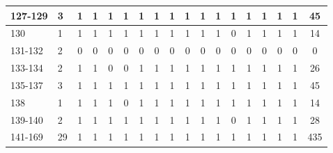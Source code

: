 \begin{table}[htbp]
\begin{center}
{\begin{tabular}{|l|l|c|c|c|c|c|c|c|c|c|c|c|c|c|c|c|c|}
                127-129                                   & 3                                               & 1          & 1          & 1          & 1          & 1          & 1          & 1          & 1          & 1          & 1          & 1          & 1          & 1          & 1          & 1          & 45           \\ \hline
                130                                       & 1                                               & 1          & 1          & 1          & 1          & 1          & 1          & 1          & 1          & 1          & 1          & 0          & 1          & 1          & 1          & 1          & 14           \\ \hline
                131-132                                   & 2                                               & 0          & 0          & 0          & 0          & 0          & 0          & 0          & 0          & 0          & 0          & 0          & 0          & 0          & 0          & 0          & 0            \\ \hline
                133-134                                   & 2                                               & 1          & 1          & 0          & 0          & 1          & 1          & 1          & 1          & 1          & 1          & 1          & 1          & 1          & 1          & 1          & 26           \\ \hline
                135-137                                   & 3                                               & 1          & 1          & 1          & 1          & 1          & 1          & 1          & 1          & 1          & 1          & 1          & 1          & 1          & 1          & 1          & 45           \\ \hline
                138                                       & 1                                               & 1          & 1          & 1          & 0          & 1          & 1          & 1          & 1          & 1          & 1          & 1          & 1          & 1          & 1          & 1          & 14           \\ \hline
                139-140                                   & 2                                               & 1          & 1          & 1          & 1          & 1          & 1          & 1          & 1          & 1          & 1          & 0          & 1          & 1          & 1          & 1          & 28           \\ \hline
                141-169                                   & 29                                              & 1          & 1          & 1          & 1          & 1          & 1          & 1          & 1          & 1          & 1          & 1          & 1          & 1          & 1          & 1          & 435          \\ \hline

\end{tabular}}
\end{center}
\end{table}
